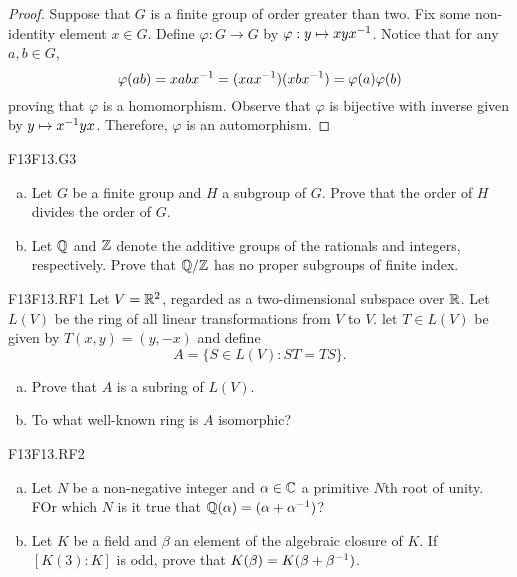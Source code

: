 \documentclass[../AlgebraQualSolutions.tex]{subfiles}
\begin{document}
\begin{proof}
Suppose that $G$ is a finite group of order greater than two. Fix some non-identity element $x \in G$. Define $\varphi: G \to G$ by $\varphi: y \mapsto xyx^{-1}$. Notice that for any $a,b \in G$,
	\[\varphi(ab) = xabx^{-1} = (xax^{-1})(xbx^{-1}) = \varphi(a)\varphi(b) \]
proving that $\varphi$ is a homomorphism. Observe that $\varphi$ is bijective with inverse given by $y \mapsto x^{-1} y x$. Therefore, $\varphi$ is an automorphism.
\end{proof}

\begin{prob}{F13}{F13.G3}

	\begin{enumerate}[(a)]
		\item Let $G$ be a finite group and $H$ a subgroup of $G$. Prove that the order of $H$ divides the order of $G$.
		\item  Let $\mathbb{Q}$ and $\mathbb{Z}$ denote the additive groups of the rationals and integers, respectively. Prove that $\mathbb{Q}/\mathbb{Z}$ has no proper subgroups of finite index.
	\end{enumerate}
\end{prob}

\begin{prob}{F13}{F13.RF1}
	Let $V = \mathbb{R}^2$, regarded as a two-dimensional subspace over $\mathbb{R}$. Let $L(V)$ be the ring of all linear transformations from $V$ to $V$. let $T \in L(V)$ be given by $T(x,y) = (y,-x)$ and define 
		\[A = \{S \in L(V): ST = TS\}. \]
	\begin{enumerate}[(a)]
		\item Prove that $A$ is a subring of $L(V)$.
		\item To what well-known ring is $A$ isomorphic?
	\end{enumerate}
\end{prob}

\begin{prob}{F13}{F13.RF2}

	\begin{enumerate}[(a)]
		\item Let $N$ be a non-negative integer and $\alpha \in \mathbb{C}$ a primitive $N$th root of unity. FOr which $N$ is it true that $\mathbb{Q}(\alpha) = (\alpha + \alpha^{-1})$?
		\item Let $K$ be a field and $\beta$ an element of the algebraic closure of $K$. If $[K(3):K]$ is odd, prove that $K(\beta) = K(\beta + \beta^{-1})$.
	\end{enumerate}
\end{prob}
\end{document}
